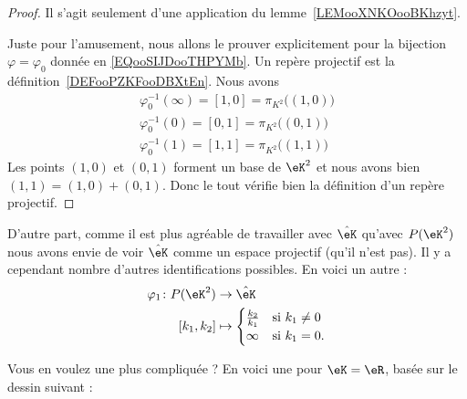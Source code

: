 \begin{proof}
	Il s'agit seulement d'une application du lemme~\ref{LEMooXNKOooBKhzyt}.

	Juste pour l'amusement, nous allons le prouver explicitement pour la bijection \( \varphi=\varphi_0\) donnée en \eqref{EQooSIJDooTHPYMb}. Un repère projectif est la définition~\ref{DEFooPZKFooDBXtEn}. Nous avons
	\begin{subequations}
		\begin{align}
			\varphi_0^{-1}(\infty)=[1,0]=\pi_{K^2}\big( (1,0) \big) \\
			\varphi_0^{-1}(0)=[0,1]=\pi_{K^2}\big( (0,1) \big)      \\
			\varphi_0^{-1}(1)=[1,1]=\pi_{K^2}\big( (1,1) \big)
		\end{align}
	\end{subequations}
	Les points \( (1,0)\) et \( (0,1)\) forment un base de \( \eK^2\) et nous avons bien \( (1,1)=(1,0)+(0,1)\). Donc le tout vérifie bien la définition d'un repère projectif.
\end{proof}

D'autre part, comme il est plus agréable de travailler avec \( \hat\eK\) qu'avec \( P(\eK^2)\) nous avons envie de voir \( \hat\eK\) comme un espace projectif (qu'il n'est pas). Il y a cependant nombre d'autres identifications possibles. En voici un autre :
\begin{equation}
	\begin{aligned}
		\varphi_1\colon P(\eK^2) & \to \hat\eK                                         \\
		[k_1,k_2]                & \mapsto \begin{cases}
			                                   \frac{ k_2 }{ k_1 } & \text{si  } k_1\neq 0 \\
			                                   \infty              & \text{si } k_1=0.
		                                   \end{cases}
	\end{aligned}
\end{equation}

Vous en voulez une plus compliquée ? En voici une pour \( \eK=\eR\), basée sur le dessin suivant :
\begin{center}
	
\end{center}


